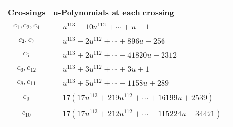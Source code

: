 \documentclass[1p]{elsarticle_modified}
\theoremstyle{definition}
\begin{document}
\begin{tabular}{m{50pt}|m{274pt}}
Crossings & \hspace{64pt}u-Polynomials at each crossing \\
\hline $$\begin{aligned}c_{1},c_{2},c_{4}\end{aligned}$$&$\begin{aligned}
&u^{113}-10 u^{112}+\cdots+u-1
\end{aligned}$\\
\hline $$\begin{aligned}c_{3},c_{7}\end{aligned}$$&$\begin{aligned}
&u^{113}-2 u^{112}+\cdots+896 u-256
\end{aligned}$\\
\hline $$\begin{aligned}c_{5}\end{aligned}$$&$\begin{aligned}
&u^{113}+2 u^{112}+\cdots-41820 u-2312
\end{aligned}$\\
\hline $$\begin{aligned}c_{6},c_{12}\end{aligned}$$&$\begin{aligned}
&u^{113}+3 u^{112}+\cdots+3 u+1
\end{aligned}$\\
\hline $$\begin{aligned}c_{8},c_{11}\end{aligned}$$&$\begin{aligned}
&u^{113}+5 u^{112}+\cdots-1158 u+289
\end{aligned}$\\
\hline $$\begin{aligned}c_{9}\end{aligned}$$&$\begin{aligned}
&17(17 u^{113}+219 u^{112}+\cdots+16199 u+2539)
\end{aligned}$\\
\hline $$\begin{aligned}c_{10}\end{aligned}$$&$\begin{aligned}
&17(17 u^{113}+212 u^{112}+\cdots-115224 u-34421)
\end{aligned}$\\
\hline
\end{tabular}\\~\\
\end{document}
